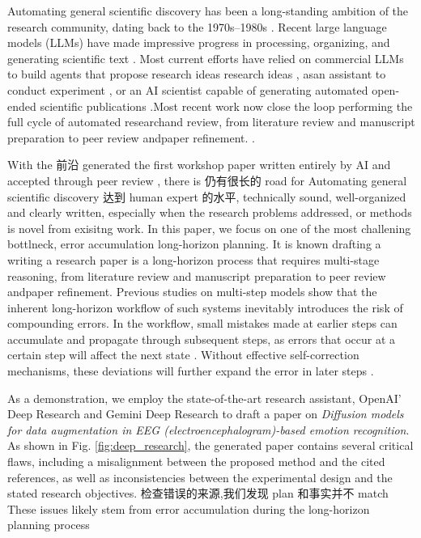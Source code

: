 \documentclass[manuscript,review,anonymous]{acmart}
\begin{document}
Automating general scientific discovery has been a long-standing ambition of the research community, dating back to the 1970s–1980s \cite{langley1987scientific}. Recent large language models (LLMs) \cite{achiam2023gpt} have made impressive progress in processing, organizing, and generating scientific text \cite{wang2023scientific}. Most current efforts have relied on commercial LLMs to build agents that propose research ideas research ideas \cite{wang2023scimon,yang2024large,baek2025researchagent}, asan assistant to conduct experiment \cite{du2024llms}, or an AI scientist capable of generating automated open-ended scientific publications \cite{lu2024ai,yamada2025ai}.Most recent work now close the loop performing the full cycle of automated researchand review, from literature review and manuscript preparation to peer review andpaper refinement.  \cite{weng2025cycleresearcher}.

With the 前沿 generated the first workshop paper written entirely by AI and accepted through peer review \cite{yamada2025ai}, there is 仍有很长的 road for Automating general scientific discovery 达到 human expert 的水平,  technically sound, well-organized and clearly written, especially when the research problems addressed, or methods is novel from exisitng work. In this paper, we focus on one of the most challening bottlneck, error accumulation long-horizon planning. It is known drafting a writing a research paper is a long-horizon process that requires multi-stage reasoning, from literature review and manuscript preparation to peer review andpaper refinement. Previous studies on multi-step models show that the inherent long-horizon workflow of such systems inevitably introduces the risk of compounding errors. In the workflow, small mistakes made at earlier steps can accumulate and propagate through subsequent steps, as errors that occur at a certain step will affect the next state \cite{wang2025expressive}. Without effective self-correction mechanisms, these deviations will further expand the error in later steps \cite{han2023expert, venkatraman2015improving, hejna2023improving}.

As a demonstration, we employ the state-of-the-art research assistant,  OpenAI' Deep Research \cite{openai2025gpt41} and Gemini Deep Research to draft a  paper on \textit{Diffusion models for data augmentation in EEG (electroencephalogram)-based emotion recognition}. As shown in Fig. \ref{fig:deep_research}, the generated paper contains several critical flaws, including a misalignment between the proposed method and the cited references, as well as inconsistencies between the experimental design and the stated research objectives. 检查错误的来源,我们发现 plan 和事实并不 match These issues likely stem from error accumulation during the long-horizon planning process
\end{document}
